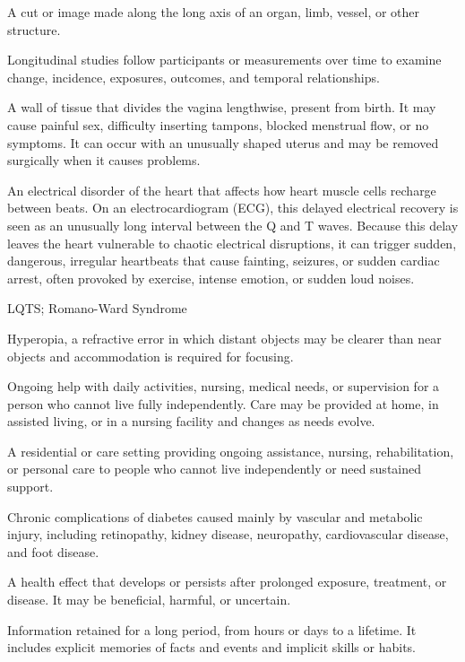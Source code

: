  A cut or image made along the long axis of an organ, limb, vessel, or other structure.

 Longitudinal studies follow participants or measurements over time to examine change, incidence, exposures, outcomes, and temporal relationships.

 A wall of tissue that divides the vagina lengthwise, present from birth. It may cause painful sex, difficulty inserting tampons, blocked menstrual flow, or no symptoms. It can occur with an unusually shaped uterus and may be removed surgically when it causes problems.

 An electrical disorder of the heart that affects how heart muscle cells recharge between beats. On an electrocardiogram (ECG), this delayed electrical recovery is seen as an unusually long interval between the Q and T waves. Because this delay leaves the heart vulnerable to chaotic electrical disruptions, it can trigger sudden, dangerous, irregular heartbeats that cause fainting, seizures, or sudden cardiac arrest, often provoked by exercise, intense emotion, or sudden loud noises.

\synonyms
LQTS; Romano-Ward Syndrome

 Hyperopia, a refractive error in which distant objects may be clearer than near objects and accommodation is required for focusing.

 Ongoing help with daily activities, nursing, medical needs, or supervision for a person who cannot live fully independently. Care may be provided at home, in assisted living, or in a nursing facility and changes as needs evolve.

 A residential or care setting providing ongoing assistance, nursing, rehabilitation, or personal care to people who cannot live independently or need sustained support.

 Chronic complications of diabetes caused mainly by vascular and metabolic injury, including retinopathy, kidney disease, neuropathy, cardiovascular disease, and foot disease.

 A health effect that develops or persists after prolonged exposure, treatment, or disease. It may be beneficial, harmful, or uncertain.

 Information retained for a long period, from hours or days to a lifetime. It includes explicit memories of facts and events and implicit skills or habits.

